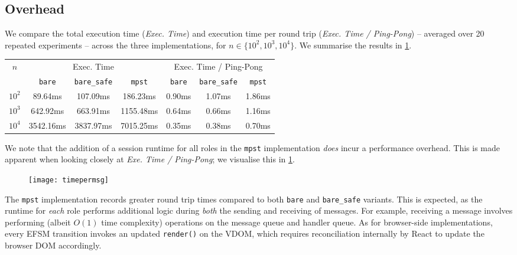 \subsection{Overhead}
We compare the total execution time (\textit{Exec. Time}) 
and execution time per round trip (\textit{Exec. Time / Ping-Pong}) -- 
averaged over 20 repeated experiments -- across the three implementations,
for $n \in \{10^2, 10^3, 10^4\}$.
We summarise the results in \cref{table:overhead}.

\renewcommand{\arraystretch}{1.5}
\begin{table}[!ht]
\centering
\begin{tabular}{||c||c|c|c||c|c|c||}
\hline
\multirow{2}{*}{$n$} & 
\multicolumn{3}{c||}{Exec. Time} & 
\multicolumn{3}{c||}{Exec. Time / Ping-Pong} \\
\cline{2-7}
 & \texttt{bare} & \texttt{bare_safe} & \texttt{mpst} 
 & \texttt{bare} & \texttt{bare_safe} & \texttt{mpst} \\
\hline\hline
$10^2$ & 89.64ms & 107.09ms & 186.23ms & 0.90ms & 1.07ms & 1.86ms \\
$10^3$ & 642.92ms & 663.91ms & 1155.48ms & 0.64ms & 0.66ms & 1.16ms \\
$10^4$ & 3542.16ms & 3837.97ms & 7015.25ms & 0.35ms & 0.38ms & 0.70ms \\
\hline
\end{tabular}
\label{table:overhead}
\end{table}
\renewcommand{\arraystretch}{1}

We note that the addition of a session runtime for all roles in the 
\texttt{mpst} implementation \textit{does} incur a performance overhead. 
This is made apparent when looking closely at 
\textit{Exe. Time / Ping-Pong};
we visualise this in \cref{fig:timepermsg}.

\begin{figure}[!ht]
\centering
\texttt{[image: timepermsg]}
\label{fig:timepermsg}
\end{figure}

The \texttt{mpst} implementation records greater round trip times compared
to both \texttt{bare} and \texttt{bare_safe} variants. This is expected,
as the runtime for \textit{each} role performs additional logic during
\textit{both} the sending and receiving of messages. 
For example, receiving a message involves performing
(albeit $O(1)$ time complexity) operations on the message queue and
handler queue. As for browser-side implementations, every EFSM transition
invokes an updated \texttt{render()} on the VDOM, which requires
reconciliation internally by React to update the browser DOM accordingly.

